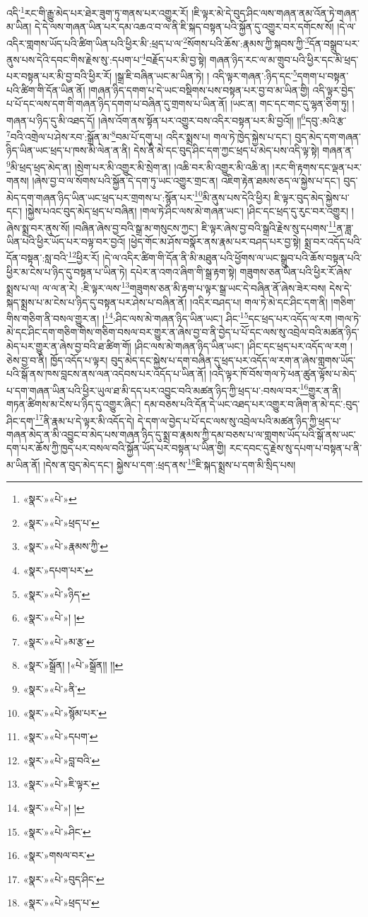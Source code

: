 འདི་\footnote{«སྣར་»«པེ་»}རང་གི་རྒྱུ་མེད་པར་ཐེར་ཟུག་ཏུ་གནས་པར་འགྱུར་རོ། །ཇི་ལྟར་མེ་དེ་བུད་ཤིང་ལས་གཞན་ནམ་འོན་ཏེ་གཞན་མ་ཡིན། དེ་དེ་ལས་གཞན་ཡིན་པར་དམ་འཆའ་བ་ལ་ནི་ཇི་སྐད་བསྟན་པའི་སྐྱོན་དུ་འགྱུར་བར་དགོངས་སོ། །དེ་ལ་འདིར་གླགས་ཡོད་པའི་ཚིག་ཡིན་པའི་ཕྱིར་མི་:ཕྲད་པ་ལ་\footnote{«སྣར་»«པེ་»ཕྲད་པ་}སོགས་པའི་ཆོས་:རྣམས་ཀྱི་སྐབས་ཀྱི་\footnote{«སྣར་»«པེ་»རྣམས་ཀྱི་}དོན་བསྒྲུབ་པར་ནུས་པས་དེའི་དབང་གིས་རྗེས་སུ་:དཔག་པ་\footnote{«སྣར་»དཔག་པར་}བརྗོད་པར་མི་བྱ་སྟེ། གཞན་ཉིད་རང་ལ་མ་གྲུབ་པའི་ཕྱིར་དང་མི་ཕྲད་པར་བསྟན་པར་མི་བྱ་བའི་ཕྱིར་རོ། །སྒྲ་ཇི་བཞིན་ཡང་མ་ཡིན་ཏེ། །
འདི་ལྟར་གཞན་:ཉིད་དང་\footnote{«སྣར་»«པེ་»ཉིད་}དགག་པ་བསྟན་པའི་ཚིག་གི་དོན་ཡིན་ནོ། །གཞན་ཉིད་དགག་པ་དེ་ཡང་བསྡིགས་པས་བསྟན་པར་བྱ་བ་མ་ཡིན་གྱི། འདི་ལྟར་བྱེད་པ་པོ་དང་ལས་དག་གི་གཞན་ཉིད་དགག་པ་བཞིན་དུ་གྲགས་པ་ཡིན་ནོ། །ཡང་ན། གང་དང་གང་དུ་ལྷན་ཅིག་ཏུ། །གཞན་པ་ཉིད་དུ་མི་འཐད་དོ། །ཞེས་འོག་ནས་སྟོན་པར་འགྱུར་བས་འདིར་བསྟན་པར་མི་བྱའོ།། །།\footnote{«སྣར་»«པེ་»། །}དབུ་:མའི་རྩ་\footnote{«སྣར་»«པེ་»མ་རྩ་}བའི་འགྲེལ་པ་ཤེས་རབ་:སྒྲོན་མ་\footnote{«སྣར་»སྒྲོན། །«པེ་»སྒྲོན།། །།}བམ་པོ་དགུ་པ། འདིར་སྨྲས་པ། གལ་ཏེ་ཁྱེད་སྐྱེས་པ་དང་། བུད་མེད་དག་གཞན་ཉིད་ཡིན་ཡང་ཕྲད་པ་ཁས་མི་ལེན་ན་ནི། དེས་ནི་མེ་དང་བུད་ཤིང་དག་ཀྱང་ཕྲད་པ་མེད་པས་འདི་ལྟ་སྟེ། གཞན་ན་\footnote{«སྣར་»«པེ་»ནི་}མི་ཕྲད་ཕྲད་མེད་ན། །སྲེག་པར་མི་འགྱུར་མི་སྲེག་ན། །འཆི་བར་མི་འགྱུར་མི་འཆི་ན། །རང་གི་རྟགས་དང་ལྡན་པར་གནས། །ཞེས་བྱ་བ་ལ་སོགས་པའི་སྐྱོན་དེ་དག་ཏུ་ཡང་འགྱུར་གྲང་ན། འཇིག་རྟེན་ཐམས་ཅད་ལ་སྐྱེས་པ་དང་། བུད་མེད་དག་གཞན་ཉིད་ཡིན་ཡང་ཕྲད་པར་གྲགས་པ་:སྙོན་པར་\footnote{«སྣར་»«པེ་»སྙོམ་པར་}མི་ནུས་པས་དེའི་ཕྱིར། ཇི་ལྟར་བུད་མེད་སྐྱེས་པ་དང་། །སྐྱེས་པའང་བུད་མེད་ཕྲད་པ་བཞིན། །གལ་ཏེ་ཤིང་ལས་མེ་གཞན་ཡང་། །ཤིང་དང་ཕྲད་དུ་རུང་བར་འགྱུར། །ཞེས་སྨྲ་བར་ནུས་སོ། །བཞིན་ཞེས་བྱ་བའི་སྒྲ་མ་གསུངས་ཀྱང་། ཇི་ལྟར་ཞེས་བྱ་བའི་སྒྲའི་རྗེས་སུ་དཔགས་\footnote{«སྣར་»«པེ་»དཔག་}ན་ཟླ་ཡིན་པའི་ཕྱིར་ཡོད་པར་བལྟ་བར་བྱའོ། །ཕྱེད་གོང་མ་ཤོས་བསྣོར་ནས་རྣམ་པར་བཤད་པར་བྱ་སྟེ། སྨྲ་བར་འདོད་པའི་དོན་བསྟན་:སླ་བའི་\footnote{«སྣར་»«པེ་»བླ་བའི་}ཕྱིར་རོ། །དེ་ལ་འདིར་ཚིག་གི་དོན་ནི་མི་མཐུན་པའི་ཕྱོགས་ལ་ཡང་སྒྲུབ་པའི་ཆོས་བསྟན་པའི་ཕྱིར་མ་ངེས་པ་ཉིད་དུ་བསྟན་པ་ཡིན་ཏེ། དཔེར་ན་འགའ་ཞིག་གི་སྒྲ་རྟག་སྟེ། གཟུགས་ཅན་ཡིན་པའི་ཕྱིར་རོ་ཞེས་སྨྲས་པ་ལ། ལ་ལ་ན་རེ། :ཇི་ལྟར་ལས་\footnote{«སྣར་»«པེ་»ཇི་ལྟར་}གཟུགས་ཅན་མི་རྟག་པ་ལྟར་སྒྲ་ཡང་དེ་བཞིན་ནོ་ཞེས་ཟེར་བས། དེས་དེ་སྐད་སྨྲས་པ་མ་ངེས་པ་ཉིད་དུ་བསྟན་པར་ཤེས་པ་བཞིན་ནོ། །འདིར་བཤད་པ། གལ་ཏེ་མེ་དང་ཤིང་དག་ནི། །གཅིག་གིས་གཅིག་ནི་བསལ་གྱུར་ན། །\footnote{«སྣར་»«པེ་»། ། }:ཤིང་ལས་མེ་གཞན་ཉིད་ཡིན་ཡང་། ཤིང་\footnote{«སྣར་»«པེ་»ཤིང་}དང་ཕྲད་པར་འདོད་ལ་རག །གལ་ཏེ་མེ་དང་ཤིང་དག་གཅིག་གིས་གཅིག་བསལ་བར་གྱུར་ན་ཞེས་བྱ་བ་ནི་བྱེད་པ་པོ་དང་ལས་སུ་འབྲེལ་བའི་མཚན་ཉིད་མེད་པར་གྱུར་ན་ཞེས་བྱ་བའི་ཐ་ཚིག་གོ། །ཤིང་ལས་མེ་གཞན་ཉིད་ཡིན་ཡང་། །ཤིང་དང་ཕྲད་པར་འདོད་ལ་རག །ཅེས་བྱ་བ་ནི། ཁྱོད་འདོད་པ་ལྟར། བུད་མེད་དང་སྐྱེས་པ་དག་བཞིན་དུ་ཕྲད་པར་འདོད་ལ་རག་ན་ཞེས་གླགས་ཡོད་པའི་སྒོ་ནས་ཁས་བླངས་ནས་ལན་འདེབས་པར་འདོད་པ་ཡིན་ནོ། །འདི་ལྟར་ཁོ་བོས་གལ་ཏེ་ཕན་ཚུན་ལྟོས་པ་མེད་པ་དག་གཞན་ཡིན་པའི་ཕྱིར་ཡུལ་ཐ་མི་དད་པར་འབྱུང་བའི་མཚན་ཉིད་ཀྱི་ཕྲད་པ་:བསལ་བར་\footnote{«སྣར་»གསལ་བར་}གྱུར་ན་ནི། གཏན་ཚིགས་མ་ངེས་པ་ཉིད་དུ་འགྱུར་ཞིང་། དམ་བཅས་པའི་དོན་དེ་ཡང་འཐད་པར་འགྱུར་བ་ཞིག་ན་མེ་དང་:བུད་ཤིང་དག་\footnote{«སྣར་»«པེ་»བུད་ཤིང་}ནི་རྣམ་པ་དེ་ལྟར་མི་འདོད་དེ། དེ་དག་ལ་བྱེད་པ་པོ་དང་ལས་སུ་འབྲེལ་པའི་མཚན་ཉིད་ཀྱི་ཕྲད་པ་གཞན་མེད་ན་མི་འབྱུང་བ་མེད་པས་གཞན་ཉིད་དུ་སྨྲ་བ་རྣམས་ཀྱི་དམ་བཅས་པ་ལ་གླགས་ཡོད་པའི་སྒོ་ནས་ཡང་དག་པར་ཆོས་ཀྱི་ཁྱད་པར་བསལ་བའི་སྐྱོན་ཡོད་པར་བསྟན་པ་ཡིན་གྱི། རང་དབང་དུ་རྗེས་སུ་དཔག་པ་བསྟན་པ་ནི་མ་ཡིན་ནོ། །དེས་ན་བུད་མེད་དང་། སྐྱེས་པ་དག་:ཕྲད་ནས་\footnote{«སྣར་»«པེ་»ཕྲད་པ་}ཇི་སྐད་སྨྲས་པ་དག་མི་སྲིད་པས། 